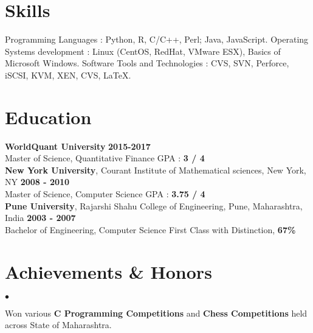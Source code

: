 \documentclass[margin,line]{res}
\newenvironment{list2}{
  \begin{list}{$\bullet$}{%
      \setlength{\itemsep}{0.05in}
      \setlength{\parsep}{0in} \setlength{\parskip}{0in}
      \setlength{\topsep}{0in} \setlength{\partopsep}{0in} 
      \setlength{\leftmargin}{0.2in}}}{\end{list}}
\begin{document}
\begin{resume}
\section{\sc Skills}
Programming Languages : Python, R, C/C++, Perl; Java, JavaScript. \newline
Operating Systems development : Linux (CentOS, RedHat, VMware ESX), Basics of Microsoft Windows. \newline 
Software Tools and Technologies : CVS, SVN, Perforce, iSCSI, KVM, XEN, CVS, \LaTeX.

\section{\sc Education}
{\bf WorldQuant University} \hfill {\bf  2015-2017}\\
Master of Science, Quantitative Finance \hfill GPA : {\bf 3 / 4}\\
 
{\bf New York University}, Courant Institute of Mathematical sciences, New York, NY \hfill {\bf 2008 - 2010}\\
Master of Science, Computer Science	\hfill GPA : {\bf 3.75 / 4}\\

{\bf Pune University}, Rajarshi Shahu College of Engineering, Pune, Maharashtra, India \hfill{\bf 2003 - 2007}\\
Bachelor of Engineering, Computer Science       	\hfill First Class with Distinction, {\bf 67\%} 

\section{\sc Achievements \& Honors}
\begin{list2}
\item Won various {\bf C Programming Competitions} and {\bf Chess Competitions} held across State of Maharashtra.
\end{list2}


\end{resume}
\end{document}
